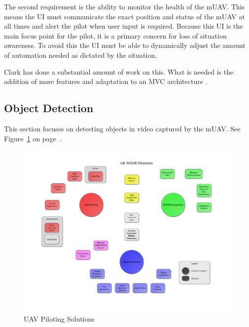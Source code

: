 \documentclass[12pt]{IEEEtran}
\begin{document}
The second requirement is the ability to monitor the health of the mUAV.
This means the UI must communicate the exact position and status of the mUAV at
all times and alert the pilot when user input is required.  Because this UI
is the main focus point for the pilot, it is a primary concern for loss of
situation awareness.  To avoid this the UI must be able to dynamically adjust
the amount of automation needed as dictated by the situation.

Clark has done a substantial amount of work on this.  What is needed is the
addition of more features and adaptation to an MVC architecture
\cite{uavCode}.

\subsection{Object Detection}
This section focuses on detecting objects
in video captured by the mUAV.  See Figure~\ref{fig:objectdetectionmap} on page~\pageref{fig:objectdetectionmap}.

\begin{figure}[htp]
	\vspace{-55pt}
	\hspace{-80pt}
	\includegraphics[keepaspectratio=true, width=\paperheight,
	height=\paperheight, page=4, angle=90, scale=0.90,
	trim=20 0 20 0]{obstacle_solution_map.pdf}
	\caption{UAV Piloting Solutions}
	\label{fig:objectdetectionmap}
\end{figure}
\end{document}
